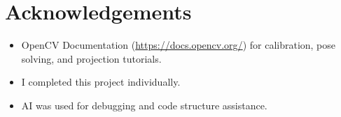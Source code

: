 \documentclass[11pt,letterpaper]{article}
\begin{document}
\section*{Acknowledgements}

\begin{itemize}
    \item OpenCV Documentation (\url{https://docs.opencv.org/}) for calibration, pose solving, and projection tutorials.
    \item I completed this project individually.
    \item AI was used for debugging and code structure assistance.
\end{itemize}
\end{document}
